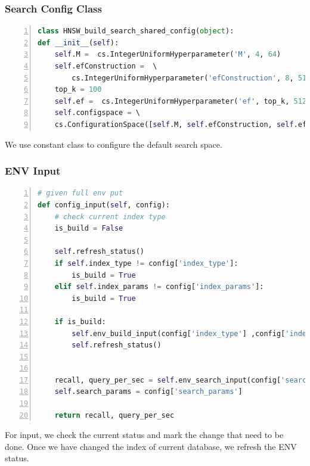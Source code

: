 \documentclass{ol-softwaremanual}
\begin{document}
\subsubsection{Search Config Class}
\begin{lstlisting}[language=python,numbers=left,basicstyle=\footnotesize, caption={Search Config Class}]
class HNSW_build_search_shared_config(object):
def __init__(self):
    self.M =  cs.IntegerUniformHyperparameter('M', 4, 64)
    self.efConstruction =  \ 
        cs.IntegerUniformHyperparameter('efConstruction', 8, 512)
    top_k = 100 
    self.ef =  cs.IntegerUniformHyperparameter('ef', top_k, 512)          
    self.configspace = \ 
    cs.ConfigurationSpace([self.M, self.efConstruction, self.ef], seed=123)
\end{lstlisting}
We use constant class to configure the default search space.


\subsubsection{ENV Input}
\begin{lstlisting}[language=python,numbers=left,basicstyle=\footnotesize, caption={Input}]
# given full env put
def config_input(self, config):
    # check current index type
    is_build = False

    self.refresh_status()
    if self.index_type != config['index_type']:
        is_build = True
    elif self.index_params != config['index_params']:
        is_build = True
    
    if is_build:
        self.env_build_input(config['index_type'] ,config['index_params'])
        self.refresh_status()
    

    recall, query_per_sec = self.env_search_input(config['search_params'])
    self.search_params = config['search_params']
    
    return recall, query_per_sec
\end{lstlisting}
For input, we check the current status and mark the change that need to be done. Once we have changed the index of current database, we refresh the ENV status.
\end{document}
